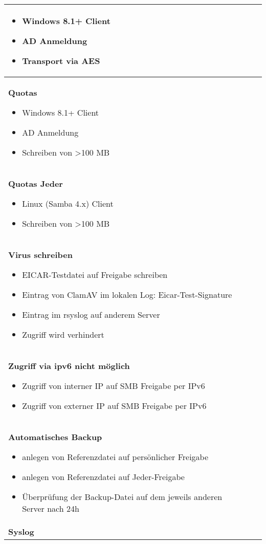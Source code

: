 \begin{longtable}{p{6.8cm}p{2.4cm}p{2.4cm}p{3cm}}
\begin{itemize}
\item
  Windows 8.1+ Client
\item
  AD Anmeldung
\item
  Transport via AES
\end{itemize} & & & \\
\midrule
\textbf{Quotas}

\begin{itemize}
\item
  Windows 8.1+ Client
\item
  AD Anmeldung
\item
  Schreiben von \textgreater{}100 MB
\end{itemize} & & & \\
\midrule
\textbf{Quotas Jeder }

\begin{itemize}
\item
  Linux (Samba 4.x) Client
\item
  Schreiben von \textgreater{}100 MB
\end{itemize} & & & \\
\midrule
\textbf{Virus schreiben}

\begin{itemize}
\item
  EICAR-Testdatei auf Freigabe schreiben
\item 
  Eintrag von ClamAV im lokalen Log: Eicar-Test-Signature
\item 
  Eintrag im rsyslog auf anderem Server
\item
  Zugriff wird verhindert
\end{itemize} & & & \\
\midrule
\textbf{Zugriff via ipv6 nicht möglich}

\begin{itemize}
\item
  Zugriff von interner IP auf SMB Freigabe per IPv6
\item
  Zugriff von externer IP auf SMB Freigabe per IPv6
\end{itemize} & & & \\
\midrule
\textbf{Automatisches Backup}

\begin{itemize}
\item
  anlegen von Referenzdatei auf persönlicher Freigabe
\item
  anlegen von Referenzdatei auf Jeder-Freigabe
\item
  Überprüfung der Backup-Datei auf dem jeweils anderen Server nach 24h
\end{itemize} & & & \\
\midrule
\textbf{Syslog}


\end{longtable}
